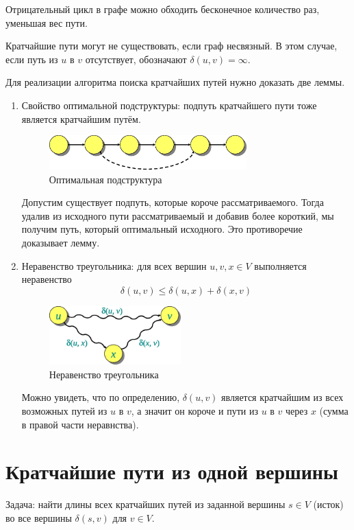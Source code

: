 \documentclass[11pt]{article}
\begin{document}
Отрицательный цикл в графе можно обходить бесконечное количество раз, уменьшая вес пути.

Кратчайшие пути могут не существовать, если граф несвязный. В этом случае, если путь из $u$ в $v$ отсутствует, обозначают $\delta(u, v) = \infty$.

Для реализации алгоритма поиска кратчайших путей нужно доказать две леммы.
\begin{enumerate}
\item Свойство оптимальной подструктуры: подпуть кратчайшего пути тоже является кратчайшим путём.
\begin{figure}[h!]
  \centering
  \includegraphics[width=3in]{lecture17/cutpaste.eps}
  \caption{Оптимальная подструктура}
\end{figure}

Допустим существует подпуть, которые короче рассматриваемого. Тогда удалив из исходного пути рассматриваемый и добавив более короткий, мы получим путь, который оптимальный исходного. Это противоречие доказывает лемму.
\item Неравенство треугольника: для всех вершин $u, v, x \in V$ выполняется неравенство
\begin{equation*}
  \delta(u, v) \leqslant \delta(u, x) + \delta(x, v)
\end{equation*}
\begin{figure}[h!]
  \centering
  \includegraphics[width=2in]{lecture17/triangle.eps}
  \caption{Неравенство треугольника}
\end{figure}
Можно увидеть, что по определению, $\delta(u, v)$ является кратчайшим из всех возможных путей из $u$ в $v$, а значит он короче и пути из $u$ в $v$ через $x$ (сумма в правой части неравнства).
\end{enumerate}

\section{Кратчайшие пути из одной вершины}
Задача: найти длины всех кратчайших путей из заданной вершины $s \in V$ (исток) во все вершины $\delta(s, v)$ для $v \in V$.
\end{document}
